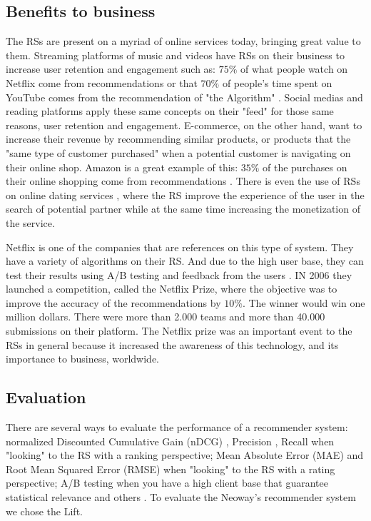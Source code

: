 \subsection{Benefits to business}

The RSs are present on a myriad of online services today, bringing great value to them. Streaming platforms of music and videos have RSs on their business to increase user retention and engagement such as: $75\%$ of what people watch on Netflix come from recommendations \cite{HowretailerscankeepupwithconsumersMcKinsey} or that $70\%$ of people's time spent on YouTube comes from the recommendation of "the Algorithm" \cite{CES2018YouTubesAIrecommendationsdrive70percentofviewingCNET}. Social medias and reading platforms apply these same concepts on their "feed" for those same reasons, user retention and engagement. E-commerce, on the other hand, want to increase their revenue by recommending similar products, or products that the "same type of customer purchased" when a potential customer is navigating on their online shop. Amazon is a great example of this: $35\%$ of the purchases on their online shopping come from recommendations \cite{HowretailerscankeepupwithconsumersMcKinsey}. There is even the use of RSs on online dating services \cite{brozovsky2007recommender}, where the RS improve the experience of the user in the search of potential partner while at the same time increasing the monetization of the service.

Netflix is one of the companies that are references on this type of system. They have a variety of algorithms on their RS. And due to the high user base, they can test their results using A/B testing and feedback from the users \cite{gomez2016netflix}. IN 2006 they launched a competition, called the Netflix Prize, where the objective was to improve the accuracy of the recommendations by $10\%$. The winner would win one million dollars. There were more than 2.000 teams and more than 40.000 submissions on their platform. The Netflix prize was an important event to the RSs in general because it increased the awareness of this technology, and its importance to business, worldwide. 

\subsection{Evaluation}
\label{ch:evaluation}

There are several ways to evaluate the performance of a recommender system: normalized Discounted Cumulative Gain (nDCG) \cite{jarvelin2002cumulated}, Precision \cite{Precision-rs-metric}, Recall \cite{cremonesi2010performance} when "looking" to the RS with a ranking perspective; Mean Absolute Error (MAE) \cite{breese1998empirical} and Root Mean Squared Error (RMSE) \cite{bennett2007netflix} when "looking" to the RS with a rating perspective; A/B testing when you have a high client base that guarantee statistical relevance and others \cite{parra2013recommender}. To evaluate the Neoway's recommender system we chose the Lift.

